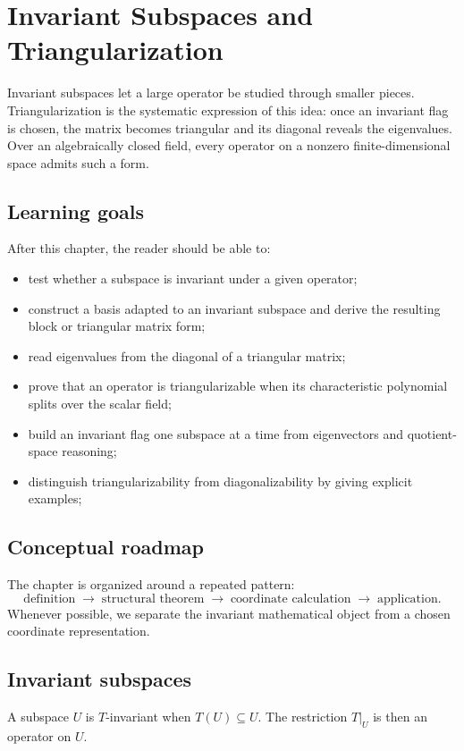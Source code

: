 \chapter{Invariant Subspaces and Triangularization}
\label{ch:i10-invariant-subspaces-and-triangularization}

Invariant subspaces let a large operator be studied through smaller pieces. Triangularization is the systematic expression of this idea: once an invariant flag is chosen, the matrix becomes triangular and its diagonal reveals the eigenvalues. Over an algebraically closed field, every operator on a nonzero finite-dimensional space admits such a form.

\section*{Learning goals}
After this chapter, the reader should be able to:
\begin{itemize}
\item test whether a subspace is invariant under a given operator;
\item construct a basis adapted to an invariant subspace and derive the resulting block or triangular matrix form;
\item read eigenvalues from the diagonal of a triangular matrix;
\item prove that an operator is triangularizable when its characteristic polynomial splits over the scalar field;
\item build an invariant flag one subspace at a time from eigenvectors and quotient-space reasoning;
\item distinguish triangularizability from diagonalizability by giving explicit examples;
\end{itemize}
\section*{Conceptual roadmap}
The chapter is organized around a repeated pattern:
\[
\boxed{\text{definition}\;\longrightarrow\;\text{structural theorem}\;\longrightarrow\;\text{coordinate calculation}\;\longrightarrow\;\text{application}.}
\]
Whenever possible, we separate the invariant mathematical object from a chosen coordinate representation.

\section{Invariant subspaces}
A subspace $U$ is $T$-invariant when $T(U)\subseteq U$. The restriction $T|_U$ is then an operator on $U$.


